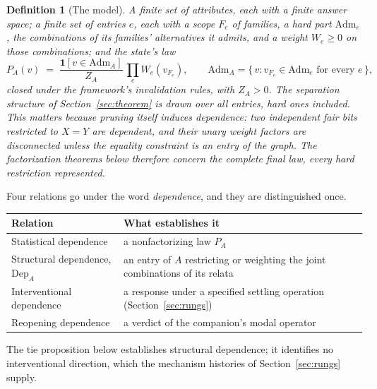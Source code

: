 \documentclass[11pt]{article}
\newtheorem{definition}{Definition}
\begin{document}
\begin{definition}[The model]\label{def:model}
A finite set of attributes, each with a finite answer space; a finite set of \emph{entries} $e$, each with a scope $F_e$ of families, a hard part $\mathrm{Adm}_e$, the combinations of its families' alternatives it admits, and a weight $W_e \ge 0$ on those combinations; and the state's law
\[
P_A(v) \;=\; \frac{\mathbf{1}[v \in \mathrm{Adm}_A]}{Z_A}\, \prod_e W_e(v_{F_e}), \qquad \mathrm{Adm}_A = \{\,v : v_{F_e} \in \mathrm{Adm}_e \text{ for every } e\,\},
\]
closed under the framework's invalidation rules, with $Z_A > 0$. The separation structure of Section~\ref{sec:theorem} is drawn over all entries, hard ones included. This matters because pruning itself induces dependence: two independent fair bits restricted to $X = Y$ are dependent, and their unary weight factors are disconnected unless the equality constraint is an entry of the graph. The factorization theorems below therefore concern the complete final law, every hard restriction represented.
\end{definition}

\noindent Four relations go under the word \emph{dependence}, and they are distinguished once.
\begin{center}\small
\begin{tabular}{p{} p{}}
\hline
\textbf{Relation} & \textbf{What establishes it} \\
\hline
Statistical dependence & a nonfactorizing law $P_A$ \\
Structural dependence, $\mathrm{Dep}_A$ & an entry of $A$ restricting or weighting the joint combinations of its relata \\
Interventional dependence & a response under a specified settling operation (Section~\ref{sec:rungs}) \\
Reopening dependence & a verdict of the companion's modal operator \cite{AethusSemantics} \\
\hline
\end{tabular}
\end{center}
\noindent The tie proposition below establishes structural dependence; it identifies no interventional direction, which the mechanism histories of Section~\ref{sec:rungs} supply.
\end{document}
